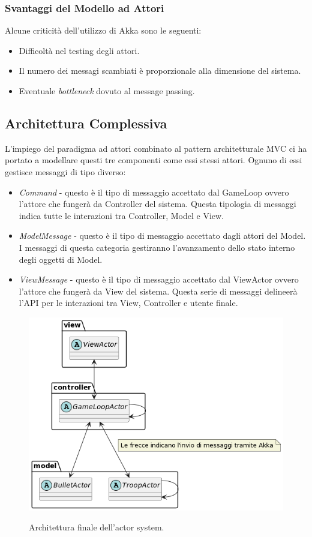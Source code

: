 \subsubsection{Svantaggi del Modello ad Attori}
Alcune criticità dell'utilizzo di Akka sono le seguenti:
\begin{itemize}
    \item Difficoltà nel testing degli attori.
    \item Il numero dei messagi scambiati è proporzionale alla dimensione del sistema.
    \item Eventuale \textit{bottleneck} dovuto al message passing.
\end{itemize}

\subsection{Architettura Complessiva}
L'impiego del paradigma ad attori combinato al pattern architetturale MVC ci ha portato a modellare questi tre componenti
come essi stessi attori. Ognuno di essi gestisce messaggi di tipo diverso:
\begin{itemize}
    \item \textit{Command} - questo è il tipo di messaggio accettato dal GameLoop ovvero l'attore che fungerà da
    Controller del sistema. Questa tipologia di messaggi indica tutte le interazioni tra Controller, Model e View.
    \item \textit{ModelMessage} - questo è il tipo di messaggio accettato dagli attori del Model. I messaggi di questa categoria
    gestiranno l'avanzamento dello stato interno degli oggetti di Model.
    \item \textit{ViewMessage} - questo è il tipo di messaggio accettato dal ViewActor ovvero l'attore che fungerà da View
    del sistema. Questa serie di messaggi delineerà l'API per le interazioni tra View, Controller e utente finale.
\end{itemize}

\begin{figure}[H]
    \centering
    \includegraphics[width=\linewidth]{images/actor-architecture}
    \label{Diagramma delle classi dell'architettura complessiva.}
    \caption{Architettura finale dell'actor system.}
\end{figure}

